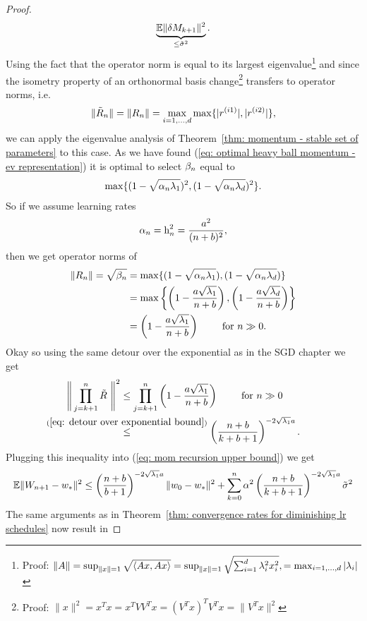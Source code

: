 \begin{proof}
\begin{align}
		\underbrace{\mathbb{E}\|\delta M_{k+1}\|^2}_{\le \tilde{\sigma}^2}.
	\end{align}
	Using the fact that the operator norm is equal to its largest eigenvalue\footnote{
		Proof: \(
			\|A\|
			= \sup_{\|x\| =1} \sqrt{\langle Ax, Ax\rangle}
			= \sup_{\|x\| =1} \sqrt{\sum_{i=1}^d \lambda_i^2 x_i^2},
			= \max_{i=1,\dots,d} |\lambda_i|
		\)
	} and since the isometry property of an orthonormal basis change\footnote{
		Proof: \(\|x\|^2 = x^Tx = x^TVV^Tx = (V^T x)^T V^Tx = \|V^T x\|^2\)
	} transfers to operator norms, i.e.
	\begin{align*}
		\|\tilde{R}_n\|=\|R_n\|
		=\max_{i=1,\dots, d} \max\{|r^{(i1)}|,|r^{(i2)}|\},
	\end{align*}
	we can apply the eigenvalue analysis of
	Theorem~\ref{thm: momentum - stable set of parameters} to this case. As we have
	found (\ref{eq: optimal heavy ball momentum - ev representation}) it is optimal
	to select \(\beta_n\) equal to
	\begin{align*}
		\max\{(1-\sqrt{\alpha_n\lambda_1})^2, (1-\sqrt{\alpha_n\lambda_d})^2\}.
	\end{align*}
	So if we assume learning rates
	\begin{align*}
		\alpha_n = \text{h}_n^2 = \frac{a^2}{(n+b)^2},
	\end{align*}
	then we get operator norms of 
	\begin{align*}
		\|R_n\| = \sqrt{\beta_n}
		&= \max\{(1-\sqrt{\alpha_n\lambda_1}), (1-\sqrt{\alpha_n\lambda_d})\}\\
		&= \max\left\{
			\left(1-\frac{a\sqrt{\lambda_1}}{n+b}\right),
			\left(1-\frac{a\sqrt{\lambda_d}}{n+b}\right)
		\right\}\\
		&= \left(1-\frac{a\sqrt{\lambda_1}}{n+b}\right) \qquad \text{ for } n \gg 0.
	\end{align*}
	Okay so using the same detour over the exponential as in the SGD chapter we get
	\begin{align*}
		\Bigg\|\prod_{j=k+1}^n\tilde{\momMatrix}\ \Bigg\|^2
		&\le \prod_{j=k+1}^n \left(1-\frac{a\sqrt{\hesseEV_1}}{n+b}\right)
		\qquad \text{ for } n \gg 0\\
		&\lxle{(\ref{eq: detour over exponential bound})}
		\left(\frac{n+b}{k+b+1}\right)^{-2\sqrt{\hesseEV_1} a}.
	\end{align*}
	Plugging this inequality into (\ref{eq: mom recursion upper bound}) we
	get
	\begin{align*}
		\mathbb{E}\|W_{n+1}-w_*\|^2
		\le\left(\frac{n+b}{b+1}\right)^{-2\sqrt{\lambda_1}a}\|w_0 - w_*\|^2
		+ \sum_{k=0}^n\alpha^2 
		\left(\frac{n+b}{k+b+1}\right)^{-2\sqrt{\lambda_1} a} \tilde{\sigma}^2
	\end{align*}
	The same arguments as in Theorem~\ref{thm: convergence rates for diminishing lr schedules}
	now result in
\end{proof}
